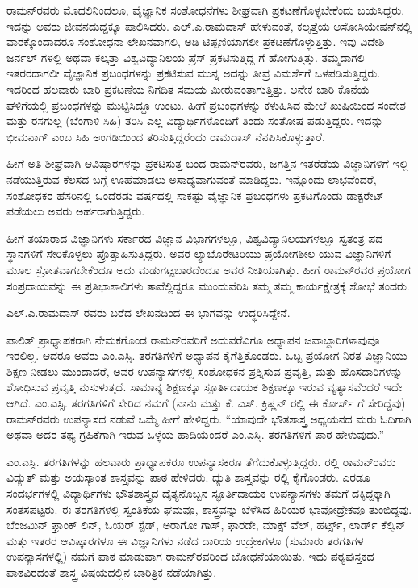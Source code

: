 ರಾಮನ್‍ರವರು ಮೊದಲಿನಿಂದಲೂ, ವೈಜ್ಞಾನಿಕ ಸಂಶೋಧನೆಗಳು ಶೀಘ್ರವಾಗಿ ಪ್ರಕಟಣೆಗೊಳ್ಳ\-ಬೇಕೆಂದು ಬಯಸಿದ್ದರು. ಇದನ್ನು ಅವರು ಜೀವನದುದ್ದಕ್ಕೂ ಪಾಲಿಸಿದರು. ಎಲ್.ಎ.ರಾಮದಾಸ್ ಹೇಳುವಂತೆ, ಕಲ್ಕತ್ತೆಯ ಅಸೋಸಿಯೇಷನ್‍ನಲ್ಲಿ ವಾರಕ್ಕೊಂದಾದರೂ ಸಂಶೋಧನಾ ಲೇಖನವಾಗಲಿ, ಅಡಿ ಟಿಪ್ಪಣಿಯಾಗಲೀ ಪ್ರಕಟಣೆಗೊಳ್ಳುತ್ತಿತ್ತು. ಇವು ವಿದೇಶಿ ಜರ್ನಲ್ ಗಳಲ್ಲಿ ಅಥವಾ ಕಲ್ಕತ್ತಾ ವಿಶ್ವವಿದ್ಯಾನಿಲಯ ಪ್ರೆಸ್ ಪ್ರಕಟಿಸುತ್ತಿದ್ದ \textit{}ಗೆ ಹೋಗುತ್ತಿತ್ತು. ತಮ್ಮದಾಗಲಿ ಇತರರದಾಗಲೀ ವೈಜ್ಞಾನಿಕ ಪ್ರಬಂಧಗಳನ್ನು ಪ್ರಕಟಿಸುವ ಮುನ್ನ ಅದನ್ನು ತೀವ್ರ ವಿಮರ್ಶೆಗೆ ಒಳಪಡಿಸುತ್ತಿದ್ದರು. ಇದರಿಂದ ಹಲವಾರು ಬಾರಿ ಪ್ರಕಟಣೆಯ ನಿಗದಿತ ಸಮಯ ಮೀರುವಂತಾಗುತ್ತಿತ್ತು. ಅನೇಕ ಬಾರಿ ಕೊನೆಯ ಘಳಿಗೆಯಲ್ಲಿ ಪ್ರಬಂಧಗಳನ್ನು ಮುಟ್ಟಿಸಿದ್ದೂ ಉಂಟು. ಹೀಗೆ ಪ್ರಬಂಧಗಳನ್ನು ಕಳುಹಿಸಿದ ಮೇಲೆ ಖುಷಿಯಿಂದ ಸಂದೇಶ ಮತ್ತು ರಸಗುಲ್ಲ (ಬೆಂಗಾಳಿ ಸಿಹಿ) ತರಿಸಿ ಎಲ್ಲ ವಿದ್ಯಾರ್ಥಿಗಳೊಂದಿಗೆ ತಿಂದು ಸಂತೋಷ ಪಡುತ್ತಿದ್ದರು. ಇದನ್ನು ಭೀಮನಾಗ್ ಎಂಬ ಸಿಹಿ ಅಂಗಡಿಯಿಂದ ತರಿಸುತ್ತಿದ್ದರೆಂದು ರಾಮದಾಸ್ ನೆನಪಿಸಿಕೊಳ್ಳುತ್ತಾರೆ.

ಹೀಗೆ ಅತಿ ಶೀಘ್ರವಾಗಿ ಆವಿಷ್ಕಾರಗಳನ್ನು ಪ್ರಕಟಿಸುತ್ತ ಬಂದ ರಾಮನ್‍ರವರು, ಜಗತ್ತಿನ ಇತರೆಡೆಯ ವಿಜ್ಞಾನಿಗಳಿಗೆ ಇಲ್ಲಿ ನಡೆಯುತ್ತಿರುವ ಕೆಲಸದ ಬಗ್ಗೆ ಊಹೆಮಾಡಲು ಅಸಾಧ್ಯವಾಗುವಂತೆ ಮಾಡಿದ್ದರು. ಇನ್ನೊಂದು ಲಾಭವೆಂದರೆ, ಸಂಶೋಧಕರ ಹೆಸರಿನಲ್ಲಿ ಒಂದೆರಡು ವರ್ಷದಲ್ಲಿ ಸಾಕಷ್ಟು ವೈಜ್ಞಾನಿಕ ಪ್ರಬಂಧಗಳು ಪ್ರಕಟಗೊಂಡು ಡಾಕ್ಟರೇಟ್ ಪಡೆಯಲು ಅವರು ಅರ್ಹರಾಗುತ್ತಿದ್ದರು.

ಹೀಗೆ ತಯಾರಾದ ವಿಜ್ಞಾನಿಗಳು ಸರ್ಕಾರದ ವಿಜ್ಞಾನ ವಿಭಾಗಗಳಲ್ಲೂ, ವಿಶ್ವವಿದ್ಯಾನಿಲಯಗಳಲ್ಲೂ ಸ್ವತಂತ್ರ ಪದ ಸ್ಥಾನಗಳಿಗೆ ಸೇರಿಕೊಳ್ಳಲು ಪ್ರೊತ್ಸಾಹಿಸುತ್ತಿದ್ದರು. ಅವರ ಲ್ಯಾಬೊರೇಟರಿಯು ಪ್ರಯೋಗಶೀಲ ಯುವ ವಿಜ್ಞಾನಿಗಳಿಗೆ ಮೂಲ ಸ್ರೋತವಾಗಬೇಕೆಂದೂ ಅದು ಮಡುಗಟ್ಟಬಾರದೆಂದೂ ಅವರ ನೀತಿಯಾಗಿತ್ತು. ಹೀಗೆ ರಾಮನ್‍ರವರ ಪ್ರಯೋಗ ಸಂಪ್ರದಾಯವನ್ನು ಈ ಪ್ರತಿಭಾಶಾಲಿಗಳು ತಾವೆಲ್ಲಿದ್ದರೂ ಮುಂದುವೆರಿಸಿ ತಮ್ಮ ತಮ್ಮ ಕಾರ್ಯಕ್ಷೇತ್ರಕ್ಕೆ ಶೋಭೆ ತಂದರು.



ಎಲ್.ಎ.ರಾಮದಾಸ್ ರವರು ಬರೆದ ಲೇಖನದಿಂದ ಈ ಭಾಗವನ್ನು ಉದ್ಧರಿಸಿದ್ದೇನೆ.

ಪಾಲಿತ್ ಪ್ರಾಧ್ಯಾಪಕರಾಗಿ ನೇಮಕಗೊಂಡ ರಾಮನ್‍ರವರಿಗೆ ಅದುವರೆವಿಗೂ ಅಧ್ಯಾಪನ ಜವಾಬ್ದಾರಿಗಳಾವುವೂ ಇರಲಿಲ್ಲ. ಆದರೂ ಅವರು ಎಂ.ಎಸ್ಸಿ. ತರಗತಿಗಳಿಗೆ ಅಧ್ಯಾಪನ ಕೈಗೆತ್ತಿಕೊಂಡರು. ಒಬ್ಬ ಪ್ರಯೋಗ ನಿರತ ವಿಜ್ಞಾನಿಯು ಶಿಕ್ಷಣ ನೀಡಲು ಮುಂದಾದರೆ, ಅವರ ಉಪನ್ಯಾಸಗಳಲ್ಲಿ ಸಂಶೋಧಕನ ಪ್ರಶ್ನಿಸುವ ಪ್ರವೃತ್ತಿ, ಮತ್ತು ಹೊಸದಾರಿಗಳನ್ನು ಶೋಧಿಸುವ ಪ್ರವೃತ್ತಿ ನುಸುಳುತ್ತದೆ. ಸಾಮಾನ್ಯ ಶಿಕ್ಷಣಕ್ಕೂ ಸ್ಫೂರ್ತಿದಾಯಕ ಶಿಕ್ಷಣಕ್ಕೂ ಇರುವ ವ್ಯತ್ಯಾಸವೆಂದರೆ ಇದೇ ಆಗಿದೆ. ಎಂ.ಎಸ್ಸಿ. ತರಗತಿಗಳಿಗೆ ಸೇರಿದ ನಮಗೆ (ನಾನು ಮತ್ತು ಕೆ. ಎಸ್. ಕ್ರಿಷ್ಣನ್ ರಲ್ಲಿ ಈ ಕೋರ್ಸ್ ಗೆ ಸೇರಿದ್ದೆವು) ರಾಮನ್‍ರವರು ಉಪನ್ಯಾಸದ ನಡುವೆ ಒಮ್ಮೆ ಹೀಗೆ ಹೇಳಿದ್ದರು. “ಯಾವುದೇ ಭೌತಶಾಸ್ತ್ರ ಅಧ್ಯಯನದ ಮರು ಓದಿಗಾಗಿ ಅಥವಾ ಅದರ ತಥ್ಯ ಗ್ರಹಿಕೆಗಾಗಿ ಇರುವ ಒಳ್ಳೆಯ ಹಾದಿಯೆಂದರೆ ಎಂ.ಎಸ್ಸಿ. ತರಗತಿಗಳಿಗೆ ಪಾಠ ಹೇಳುವುದು.”

ಎಂ.ಎಸ್ಸಿ. ತರಗತಿಗಳನ್ನು ಹಲವಾರು ಪ್ರಾಧ್ಯಾಪಕರೂ ಉಪನ್ಯಾಸಕರೂ ತೆಗೆದುಕೊಳ್ಳುತ್ತಿದ್ದರು. ರಲ್ಲಿ ರಾಮನ್‍ರವರು ವಿದ್ಯುತ್ ಮತ್ತು ಅಯಸ್ಕಾಂತ ಶಾಸ್ತ್ರವನ್ನು ಪಾಠ ಹೇಳಿದರು. ದ್ಯುತಿ ಶಾಸ್ತ್ರವನ್ನು ರಲ್ಲಿ ಕೈಗೊಂಡರು. ಎರಡೂ ಸಂದರ್ಭಗಳಲ್ಲಿ ವಿದ್ಯಾರ್ಥಿಗಳು ಭೌತಶಾಸ್ತ್ರದ ದೈತ್ಯನೊಬ್ಬನ ಸ್ಫೂರ್ತಿದಾಯಕ ಉಪನ್ಯಾಸಗಳು ತಮಗೆ ದಕ್ಕಿದ್ದಕ್ಕಾಗಿ ಸಂತಸಪಟ್ಟರು. ಈ ತರಗತಿಗಳಲ್ಲಿ ಸ್ವಂತಿಕೆಯ ಘಮವೂ, ಶಾಸ್ತ್ರವನ್ನು ಬೆಳೆಸಿದ ಹಿರಿಯರ ಭಾವೋದ್ರೇಕವೂ ತುಂಬಿದ್ದವು. ಬೆಂಜಮಿನ್ ಫ್ರಾಂಕ್ ಲಿನ್, ಓಯರ್ ಸ್ಪೆಡ್, ಅರಾಗೋ ಗಾಸ್, ಫಾರಡೇ, ಮಾಕ್ಸ್ ವೆಲ್, ಹರ್ಟ್ಸ್, ಲಾರ್ಡ್ ಕೆಲ್ವಿನ್ ಮತ್ತು ಇತರರ ಆವಿಷ್ಕಾರಗಳೂ ಈ ವಿಜ್ಞಾನಿಗಳು ನಡೆದ ದಾರಿಯ ಉದ್ರೇಕಗಳೂ (ಸುಮಾರು  ತರಗತಿಗಳ ಉಪನ್ಯಾಸಗಳಲ್ಲಿ) ನಮಗೆ \textit{} ಪಾಠ ಮಾಡುವಾಗ ರಾಮನ್‍ರವರಿಂದ ಬೋಧನೆಯಾಯಿತು. ಇದು ಪಠ್ಯಪುಸ್ತಕದ ಪಾಠವಿರದಂತೆ ಶಾಸ್ತ್ರ ವಿಷಯದಲ್ಲಿನ ಚಾರಿತ್ರಿಕ ನಡೆಯಾಗಿತ್ತು.

